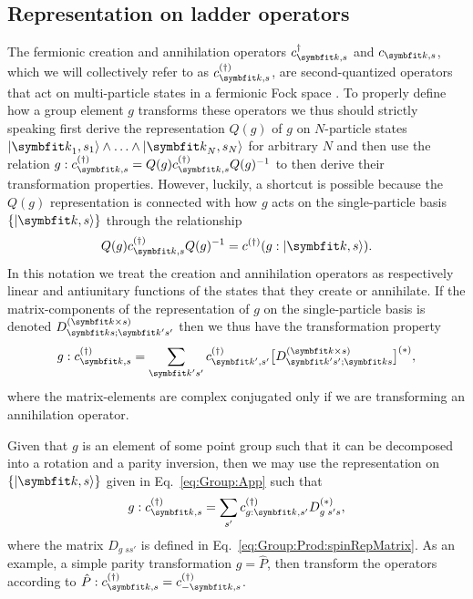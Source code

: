 \subsection{Representation on ladder operators}
\label{sec:Group:App:Ladder}

The fermionic creation and annihilation operators $c^\dagger_{\v{k},s}$ and $c_{\v{k},s}$, which we will collectively refer to as
$c^{(\dagger)}_{\v{k},s}$, are second-quantized operators that act on multi-particle
states in a fermionic Fock space \cite{NegeleOrland98}. To properly define how a group element $g$ transforms these operators we thus should
strictly speaking first derive the representation $Q(g)$ of $g$ on $N$-particle states $\ket{\v{k}_1,s_1}\land\ldots\land\ket{\v{k}_N,s_N}$ for
arbitrary $N$ and then use the relation $g:c^{(\dagger)}_{\v{k},s} = Q(g)c^{(\dagger)}_{\v{k},s}Q(g)^{-1}$ to then derive their transformation properties.
However, luckily, a shortcut is possible because the $Q(g)$ representation is connected with how $g$ acts on the single-particle basis
$\{\ket{\v{k},s}\}$ through the relationship
\begin{equation}
    \label{eq:Group:App:Ladder:quantizedRepToSingleParticleBasis}
    Q(g)c^{(\dagger)}_{\v{k},s}Q(g)^{-1} = c^{(\dagger)}(g:\ket{\v{k},s}).
\end{equation}
In this notation we treat the creation and annihilation operators as respectively linear and antiunitary functions of the states that they create or
annihilate. If the matrix-components of the representation of $g$ on the single-particle basis is denoted $D_{\v{k}s;\v{k}'s'}^{(\v{k}\times s)}$ then
we thus have the transformation property
\begin{equation}
    \label{eq:Group:App:Ladder:generalTransformationBehavior}
    g:c^{(\dagger)}_{\v{k},s} = \sum_{\v{k}'s'}c^{(\dagger)}_{\v{k}',s'}\big[D_{\v{k}'s';\v{k}s}^{(\v{k}\times s)}\big]^{(\ast)},
\end{equation}
where the matrix-elements are complex conjugated only if we are transforming an annihilation operator.

Given that $g$ is an element of some point group such that it can be decomposed into a rotation and a parity inversion, then we may use the
representation on $\{\ket{\v{k},s}\}$ given in Eq.~\eqref{eq:Group:App} such that
\begin{equation}
    \label{eq:Group:App:Ladder:pointGroupTransformation}
    g:c^{(\dagger)}_{\v{k},s} = \sum_{s'}c^{(\dagger)}_{g:\v{k},s'}D_{g\;s's}^{(\ast)},
\end{equation}
where the matrix $D_{g\;ss'}$ is defined in Eq.~\eqref{eq:Group:Prod:spinRepMatrix}. As an example, a simple parity transformation $g=\hat{P}$, then
transform the operators according to $\hat{P}:c^{(\dagger)}_{\v{k},s} = c^{(\dagger)}_{-\v{k},s}$.

